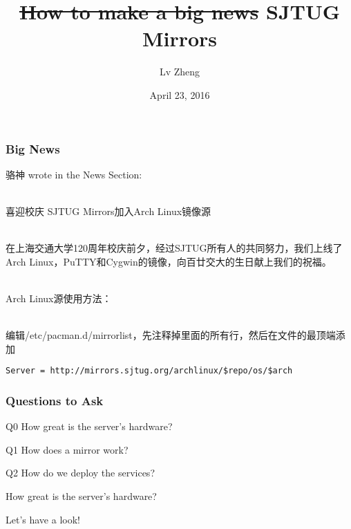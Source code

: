 \documentclass{beamer}
\title[SJTUG Mirrors]{\texorpdfstring{\sout{How to make a big news}}{} SJTUG Mirrors}
\author{Lv Zheng}
\institute[SJTUG]
{
SJTUG\\
\medskip
\textit{lv.zheng.2015@gmail.com}
}
\date{April 23, 2016}
\begin{document}

\begin{frame}[fragile]
\frametitle{Big News}
\begin{CJK}{UTF8}{gbsn}

骆神 wrote in the News Section:\\~

喜迎校庆 SJTUG Mirrors加入Arch Linux镜像源\\~

在上海交通大学120周年校庆前夕，经过SJTUG所有人的共同努力，我们上线了Arch
Linux，PuTTY和Cygwin的镜像，向百廿交大的生日献上我们的祝福。\\~

Arch Linux源使用方法：\\~

编辑/etc/pacman.d/mirrorlist，先注释掉里面的所有行，然后在文件的最顶端添加
\end{CJK}

\begin{verbatim}
Server = http://mirrors.sjtug.org/archlinux/$repo/os/$arch
\end{verbatim}

\end{frame}


\begin{frame}
\titlepage
\end{frame}


\begin{frame} 
\frametitle{Questions to Ask}
\begin{block}{Q0}
How great is the server's hardware?
\end{block}
\begin{block}{Q1}
How does a mirror work?
\end{block}
\begin{block}{Q2}
How do we deploy the services?
\end{block}
\end{frame}


\begin{frame}
\huge{\centerline{How great is the server's hardware?}}
\large{\centerline{Let's have a look!}}
\end{frame}
\end{document}
